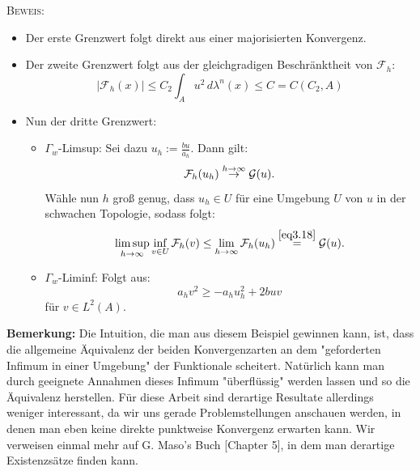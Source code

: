 \textsc{Beweis:} \begin{itemize}
    \item Der erste Grenzwert folgt direkt aus einer majorisierten Konvergenz.
    \item Der zweite Grenzwert folgt aus der gleichgradigen Beschränktheit von \(\mathcal{F}_h\):
\begin{equation}
    |\mathcal{F}_h(x)| \leq C_2 \int_A u^2 \,d\lambda^n(x) \leq C=C(C_2,A)
\end{equation}
    \item Nun der dritte Grenzwert: 
    \begin{itemize}
        \item \(\Gamma_w\)-Limsup: Sei dazu \(u_h := \frac{bu}{a_h}\). Dann gilt:
\begin{equation}{\label{eq3.18}}
    \mathcal{F}_h (u_h) \stackrel{h \to \infty}{\to} \mathcal{G}(u).
\end{equation}
Wähle nun \(h\) groß genug, dass \(u_h \in U\) für eine Umgebung \(U\) von \(u\) in der schwachen Topologie, sodass folgt:
\begin{equation}
    \limsup_{h \to \infty} \inf_{v \in U} \mathcal{F}_h (v) \leq \lim_{h \to \infty} \mathcal{F}_h (u_h) \stackrel{\eqref{eq3.18}}{=} \mathcal{G}(u).
\end{equation}
\item \(\Gamma_w\)-Liminf: Folgt aus:
\begin{equation}
    a_h v^2 \geq - a_h u_h^2 + 2buv
\end{equation}
für \(v \in L^2(A)\).\QEDB
    \end{itemize}
\end{itemize}

\textbf{Bemerkung:} Die Intuition, die man aus diesem Beispiel gewinnen kann, ist, dass die allgemeine Äquivalenz der beiden Konvergenzarten an dem "geforderten Infimum in einer Umgebung" der Funktionale scheitert. Natürlich kann man durch geeignete Annahmen dieses Infimum "überflüssig" werden lassen und so die Äquivalenz herstellen. Für diese Arbeit sind derartige Resultate allerdings weniger interessant, da wir uns gerade Problemstellungen anschauen werden, in denen man eben keine direkte punktweise Konvergenz erwarten kann. Wir verweisen einmal mehr auf G. Maso's Buch \cite{MasoGamma}[Chapter 5], in dem man derartige Existenzsätze finden kann.

